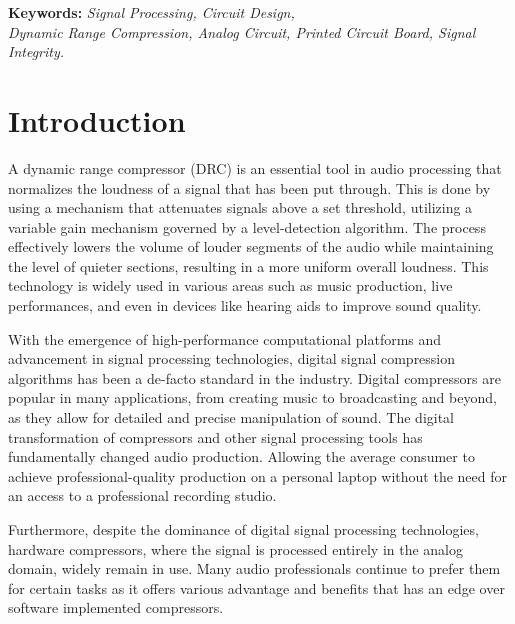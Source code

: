 \documentclass[10pt]{article}
\begin{document}
    \begin{multicols*}{2}

        \textbf{Keywords:} \textit{Signal Processing, Circuit Design,\\Dynamic Range Compression, Analog Circuit, Printed Circuit Board, Signal Integrity.}

        \section{Introduction}
            A dynamic range compressor (DRC) is an essential tool in audio processing that normalizes the loudness of a signal that has been put through. This is done by using a mechanism that attenuates signals above a set threshold, utilizing a variable gain mechanism governed by a level-detection algorithm. The process effectively lowers the volume of louder segments of the audio while maintaining the level of quieter sections, resulting in a more uniform overall loudness. This technology is widely used in various areas such as music production, live performances, and even in devices like hearing aids to improve sound quality.\par
            With the emergence of high-performance computational platforms and advancement in signal processing technologies, digital signal compression algorithms has been a de-facto standard in the industry. Digital compressors are popular in many applications, from creating music to broadcasting and beyond, as they allow for detailed and precise manipulation of sound. The digital transformation of compressors and other signal processing tools has fundamentally changed audio production. Allowing the average consumer to achieve professional-quality production on a personal laptop without the need for an access to a professional recording studio.\par
            Furthermore, despite the dominance of digital signal processing technologies, hardware compressors, where the signal is processed entirely in the analog domain, widely remain in use. Many audio professionals continue to prefer them for certain tasks as it offers various advantage and benefits that has an edge over software implemented compressors.\par

\end{multicols*}
\end{document}
